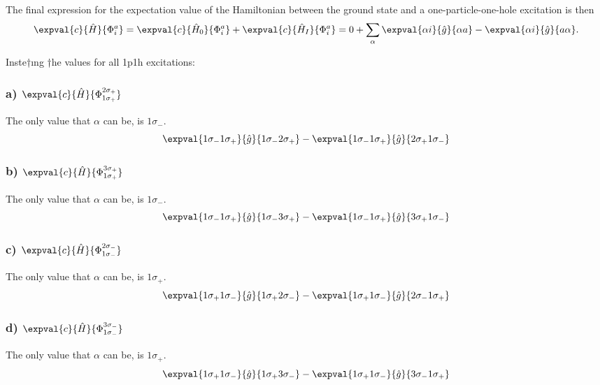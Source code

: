 The final expression for the expectation value of the Hamiltonian between the ground state and a one-particle-one-hole excitation is then
\begin{equation*}
    \expval{c}{\hat{H}}{\Phi_i^a} = \expval{c}{\hat{H}_0}{\Phi_i^a} + \expval{c}{\hat{H}_I}{\Phi_i^a} = 0 + \sum_{\alpha} \expval{\alpha i}{\hat{g}}{\alpha a} - \expval{\alpha i}{\hat{g}}{a \alpha}.
\end{equation*}

Inste†ıng †he values for all 1p1h excitations:

\subsubsection*{a) $\expval{c}{\hat{H}}{\Phi_{1\sigma_{+}}^{2\sigma_{+}}}$} %
The only value that $\alpha$ can be, is $1\sigma_{-}$.
\begin{equation*}
    \expval{1\sigma_{-} 1\sigma_{+}}{\hat{g}}{1\sigma_{-} 2\sigma_{+}} - \expval{1\sigma_{-} 1\sigma_{+}}{\hat{g}}{2\sigma_{+} 1\sigma_{-}}
\end{equation*}

\subsubsection*{b) $\expval{c}{\hat{H}}{\Phi_{1\sigma_{+}}^{3\sigma_{+}}}$} %
The only value that $\alpha$ can be, is $1\sigma_{-}$.
\begin{equation*}
    \expval{1\sigma_{-} 1\sigma_{+}}{\hat{g}}{1\sigma_{-} 3\sigma_{+}} - \expval{1\sigma_{-} 1\sigma_{+}}{\hat{g}}{3\sigma_{+} 1\sigma_{-}}
\end{equation*}

\subsubsection*{c) $\expval{c}{\hat{H}}{\Phi_{1\sigma_{-}}^{2\sigma_{-}}}$} %
The only value that $\alpha$ can be, is $1\sigma_{+}$.
\begin{equation*}
    \expval{1\sigma_{+} 1\sigma_{-}}{\hat{g}}{1\sigma_{+} 2\sigma_{-}} - \expval{1\sigma_{+} 1\sigma_{-}}{\hat{g}}{2\sigma_{-} 1\sigma_{+}}
\end{equation*}

\subsubsection*{d) $\expval{c}{\hat{H}}{\Phi_{1\sigma_{-}}^{3\sigma_{-}}}$} %
The only value that $\alpha$ can be, is $1\sigma_{+}$.
\begin{equation*}
    \expval{1\sigma_{+} 1\sigma_{-}}{\hat{g}}{1\sigma_{+} 3\sigma_{-}} - \expval{1\sigma_{+} 1\sigma_{-}}{\hat{g}}{3\sigma_{-} 1\sigma_{+}}
\end{equation*}

